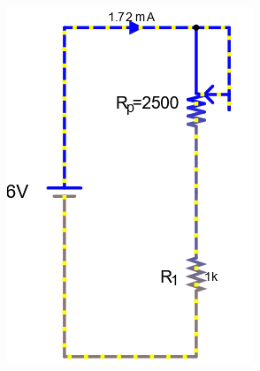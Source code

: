 \documentclass[a4paper]{article}
\begin{document}
\begin{figure}[H]
\begin{subfigure}{0.333\textwidth}
        \includegraphics[width=.9\linewidth]{amp6}
    \end{subfigure}
    \begin{subfigure}{0.333\textwidth}

\end{subfigure}
\end{figure}
\end{document}
